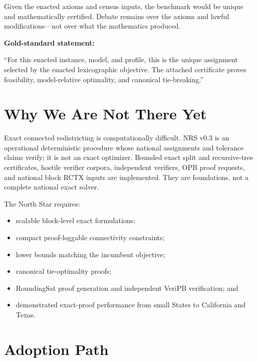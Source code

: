 \documentclass[11pt,twocolumn]{article}
\begin{document}
Given the enacted axioms and census inputs, the benchmark would be unique and
mathematically certified. Debate remains over the axioms and lawful
modifications---not over what the mathematics produced.

\begin{mdframed}[style=greenbox]
\textbf{Gold-standard statement:}

``For this enacted instance, model, and profile, this is the unique assignment
selected by the enacted lexicographic objective. The attached certificate
proves feasibility, model-relative optimality, and canonical tie-breaking.''
\end{mdframed}

\section*{Why We Are Not There Yet}

Exact connected redistricting is computationally difficult. NRS v0.3 is an
operational deterministic procedure whose national assignments and tolerance
claims verify; it is not an exact optimizer. Bounded exact split and
recursive-tree certificates, hostile verifier corpora, independent verifiers,
OPB proof requests, and national block RCTX inputs are implemented. They are
foundations, not a complete national exact solver.

The North Star requires:

\begin{itemize}[leftmargin=*,nosep]
\item scalable block-level exact formulations;
\item compact proof-loggable connectivity constraints;
\item lower bounds matching the incumbent objective;
\item canonical tie-optimality proofs;
\item RoundingSat proof generation and independent VeriPB verification; and
\item demonstrated exact-proof performance from small States to California and
Texas.
\end{itemize}

\section*{Adoption Path}
\end{document}
